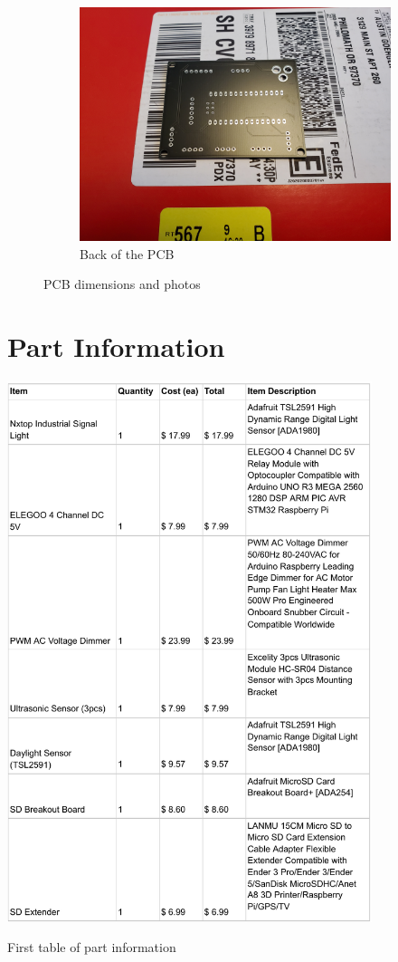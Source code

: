 \documentclass{article}
\begin{document}
\begin{figure}[H]
\begin{subfigure}[b]{0.45\textwidth}
        \centering
        \includegraphics[width=\linewidth]{fig/pcb-back.jpg}
        \caption[]%
        {Back of the PCB}
    \end{subfigure} 
    \hfill
    \caption{PCB dimensions and photos} 
    \label{fig:pcb}
\end{figure}

\section{Part Information}
\begin{table}[H]
    \centering
    \includegraphics[width=0.8\textwidth]{fig/part-info-1.pdf}
    \caption{First table of part information}
    \label{fig:part-1}
\end{table}
\end{document}
